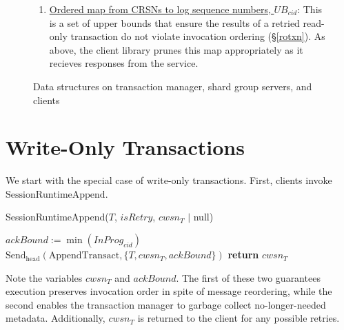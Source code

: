 \documentclass{article}
\begin{document}
\begin{figure}[H]
\begin{tcolorbox}[title= On \textbf{client} $cid$, enhanced,width=1.05\textwidth, left skip=-0.5cm, colback=black!4!white]
\begin{enumerate}[itemsep=1pt]
  \item \underline{Ordered map from CRSNs to log sequence numbers, $UB_{cid}$}: This is a set of upper bounds that ensure the results of a retried read-only transaction do not violate invocation ordering (\S \ref{rotxn}). As above, the client library prunes this map appropriately as it recieves responses from the service. 
  \end{enumerate}
\end{tcolorbox}
\caption{Data structures on transaction manager, shard group servers, and clients}

\end{figure}



\newpage
\section{Write-Only Transactions} \label{wotxn}
\par We start with the special case of write-only transactions. First, clients invoke $\text{SessionRuntimeAppend}$. \\
\begin{procedure}[H]
  \caption{SessionRuntimeAppend($T$, $isRetry$, $cwsn_T$ $|$   null)}
  $ackBound := \min(InProg_{cid})$ \\
  $\text{Send}_{\text{head}}(\text{AppendTransact}, \{T, cwsn_T, ackBound\})$  
  \textbf{return} $cwsn_T$
\end{procedure}
Note the variables $cwsn_T$ and $ackBound$. The first of these two guarantees execution preserves invocation order in spite of message reordering, while the second enables the transaction manager to garbage collect no-longer-needed metadata. Additionally, $cwsn_T$ is returned to the client for any possible retries. \\
\end{document}

